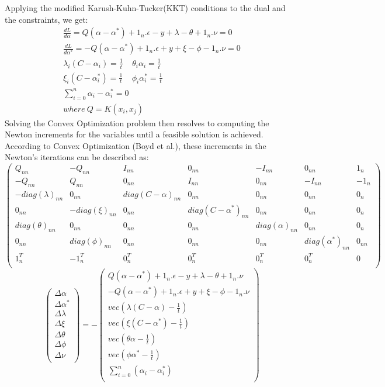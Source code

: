 \documentclass[12pt]{article}
\begin{document}
 Applying the modified Karush-Kuhn-Tucker(KKT) conditions to the dual and the constraints, we get:
 \begin{gather*} 
 \frac{dL}{d\alpha} = Q(\alpha - \alpha^*) + 1_{n}.\epsilon - y + \lambda - \theta + 1_{n}.\nu=0 \\
 \frac{dL}{d\alpha^*} = -Q(\alpha - \alpha^*) + 1_{n}.\epsilon + y + \xi - \phi - 1_{n}.\nu=0 \\
 \lambda_{i}(C-\alpha_{i}) =\frac{1}{t}\ \ \ \ \ 
 \theta_{i}\alpha_{i} =\frac{1}{t}\\
 \xi_{i}(C-\alpha^*_{i}) =\frac{1}{t}\ \ \ \ \ 
 \phi_{i}\alpha^*_{i} =\frac{1}{t}\\
 \sum_{i=0}^{n}{\alpha_{i} - \alpha_{i}^*} =0\\
 where\ Q=K(x_{i}, x_{j})
 \end{gather*}
 Solving the Convex Optimization problem then resolves to computing the Newton increments for the variables until a feasible solution is achieved.
 According to Convex Optimization (Boyd et al.), these increments in the Newton's iterations can be described as:
 \newline
\[
\begin{pmatrix} 
Q_{nn}&-Q_{nn}&I_{nn}&0_{nn}&-I_{nn}&0_{nn}&1_{n}\\
-Q_{nn}&Q_{nn}&0_{nn}&I_{nn}&0_{nn}&-I_{nn}&-1_{n}\\
-diag(\lambda)_{nn}&0_{nn}&diag(C-\alpha)_{nn}&0_{nn}&0_{nn}&0_{nn}&0_{n}\\
0_{nn}&-diag(\xi)_{nn}&0_{nn}&diag(C-\alpha^*)_{nn}&0_{nn}&0_{nn}&0_{n}\\
diag(\theta)_{nn}&0_{nn}&0_{nn}&0_{nn}&diag(\alpha)_{nn}&0_{nn}&0_{n}\\
0_{nn}&diag(\phi)_{nn}&0_{nn}&0_{nn}&0_{nn}&diag(\alpha^*)_{nn}&0_{nn}\\
1_{n}^T&-1_{n}^T&0_{n}^T&0_{n}^T&0_{n}^T&0_{n}^T&0\\
\end{pmatrix}
\]
\[
\begin{pmatrix} 
\Delta \alpha\\
\Delta \alpha^*\\
\Delta\lambda\\
\Delta\xi\\
\Delta\theta\\
\Delta\phi\\
\Delta\nu\\
\end{pmatrix}
=-
\begin{pmatrix} 
Q(\alpha - \alpha^*) + 1_{n}.\epsilon - y + \lambda - \theta + 1_{n}.\nu\\
-Q(\alpha - \alpha^*) + 1_{n}.\epsilon + y + \xi - \phi - 1_{n}.\nu\\
vec(\lambda(C-\alpha)-\frac{1}{t})\\
vec(\xi(C-\alpha^*)-\frac{1}{t})\\
vec(\theta\alpha-\frac{1}{t})\\
vec(\phi \alpha^*-\frac{1}{t})\\
\sum_{i=0}^{n}{(\alpha_{i} - \alpha_{i}^*)}\\
\end{pmatrix}
\]
\end{document}
